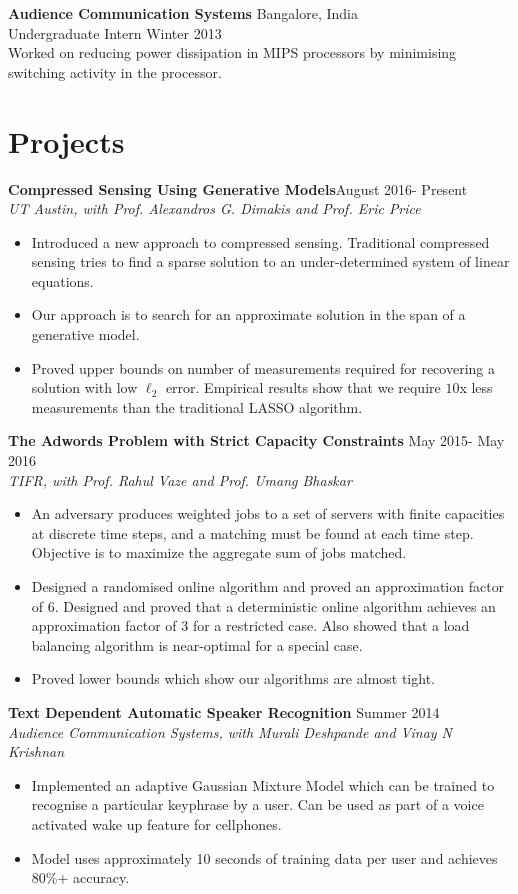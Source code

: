 \documentclass[margin, 11pt]{res} %
\begin{document}
\begin{resume}
{\bf Audience Communication Systems} \hfill Bangalore, India\\
Undergraduate Intern \hfill Winter 2013\\
Worked on reducing power dissipation in MIPS processors by minimising switching activity
in the processor.

\section{\large Projects}

{\bf Compressed Sensing Using Generative Models}\hfill August 2016- Present\\
{\sl UT Austin, with Prof. Alexandros G. Dimakis and Prof. Eric Price}
\begin{itemize}
	\item Introduced a new approach to compressed sensing. Traditional compressed sensing tries to find a sparse solution to an under-determined system of linear equations.
	\item Our approach is to search for an approximate solution in the span of a generative model.
	\item Proved upper bounds on number of measurements required for recovering a solution with low $\ell_2$ error. Empirical results show that we require $10$x less measurements than the traditional LASSO algorithm.
\end{itemize}

\pagebreak

{\bf The Adwords Problem with Strict Capacity Constraints} \hfill May 2015- May 2016\\
{\sl TIFR, with Prof. Rahul Vaze and Prof. Umang Bhaskar}
\begin{itemize}\itemsep -2pt
	\item An adversary produces weighted jobs to a set of servers with finite capacities at discrete	time steps, and a matching must be found at each time step. Objective is to maximize the aggregate sum of jobs matched.
	\item Designed a randomised online algorithm and proved an approximation factor of 6.
	Designed and proved that a deterministic online algorithm achieves an approximation
	factor of 3 for a restricted case. Also showed that a load balancing algorithm is near-optimal for a special case.
	\item Proved lower bounds which show our algorithms are almost tight.
\end{itemize}

{\bf Text Dependent Automatic Speaker Recognition} \hfill Summer 2014\\
{\sl Audience Communication Systems, with Murali Deshpande and Vinay N Krishnan}
\begin{itemize}\itemsep -2pt
	\item Implemented an adaptive Gaussian Mixture Model which can be trained to recognise a particular
	keyphrase by a 	user. Can be used as part of a voice activated wake up feature for
	cellphones.
	\item Model uses approximately 10 seconds of training data per user and achieves 80\%+ accuracy.
\end{itemize}


\end{resume}
\end{document}
